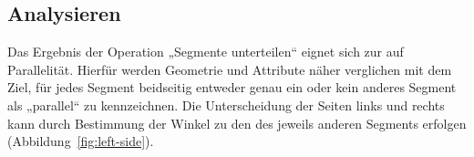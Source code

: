 \documentclass[../main/thesis.tex]{subfiles}
\begin{document}
\subsection{Analysieren}
\label{ch:analyse-algorithm}

Das Ergebnis der Operation „Segmente unterteilen“ eignet sich zur  auf Parallelität.
Hierfür werden Geometrie und Attribute näher verglichen mit dem Ziel, für jedes Segment beidseitig entweder genau ein oder kein anderes Segment als „parallel“ zu kennzeichnen.
%
Die Unterscheidung der Seiten links und rechts kann durch Bestimmung der Winkel zu den  des jeweils anderen Segments erfolgen (Abbildung~\ref{fig:left-side}).


\end{document}
